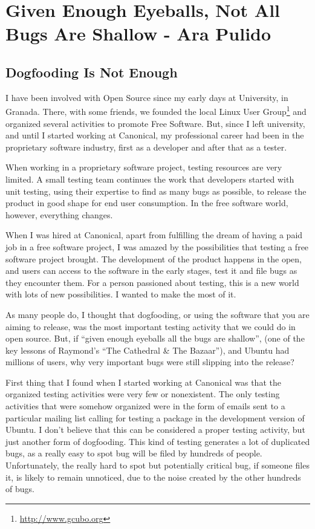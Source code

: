\chapter{Given Enough Eyeballs, Not All Bugs Are Shallow - Ara Pulido}
\section*{Dogfooding Is Not Enough} 

I have been involved with Open Source since my early days at University, in Granada. There, with some friends, we founded the local Linux User Group\footnote{\url{http://www.gcubo.org}} and organized several activities to promote Free Software. But, since I left university, and until I started working at Canonical, my professional career had been in the proprietary software industry, first as a developer and after that as a tester.

When working in a proprietary software project, testing resources are very limited. A small testing team continues the work that developers started with unit testing, using their expertise to find as many bugs as possible, to release the product in good shape for end user consumption. In the free software world, however, everything changes.

When I was hired at Canonical, apart from fulfilling the dream of having a paid job in a free software project, I was amazed by the possibilities that testing a free software project brought. The development of the product happens in the open, and users can access to the software in the early stages, test it and file bugs as they encounter them. For a person passioned about testing, this is a new world with lots of new possibilities. I wanted to make the most of it.

As many people do, I thought that dogfooding, or using the software that you are aiming to release, was the most important testing activity that we could do in open source. But, if ``given enough eyeballs all the bugs are shallow'', (one of the key lessons of Raymond's ``The Cathedral \& The Bazaar''), and Ubuntu had millions of users, why very important bugs were still slipping into the release?

First thing that I found when I started working at Canonical was that the organized testing activities were very few or nonexistent. The only testing activities that were somehow organized were in the form of emails sent to a particular mailing list calling for testing a package in the development version of Ubuntu. I don't believe that this can be considered a proper testing activity, but just another form of dogfooding. This kind of testing generates a lot of duplicated bugs, as a really easy to spot bug will be filed by hundreds of people. Unfortunately, the really hard to spot but potentially critical bug, if someone files it, is likely to remain unnoticed, due to the noise created by the other hundreds of bugs.

